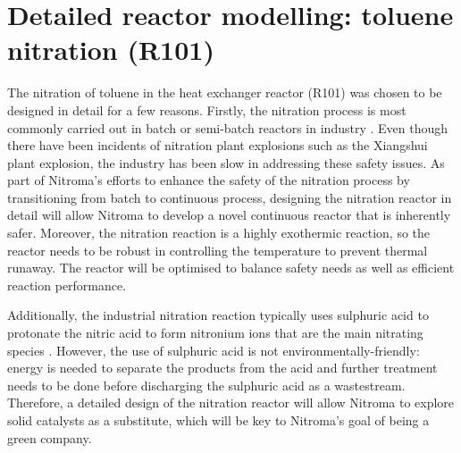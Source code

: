 \section{Detailed reactor modelling: toluene nitration (R101)} \label{sec:detailedreactor}

The nitration of toluene in the heat exchanger reactor (R101) was chosen to be designed in detail for a few reasons. Firstly, the nitration process is most commonly carried out in batch or semi-batch reactors in industry \cite{dugal_nitrobenzene_2005}. Even though there have been incidents of nitration plant explosions such as the Xiangshui plant explosion, the industry has been slow in addressing these safety issues. As part of Nitroma's efforts to enhance the safety of the nitration process by transitioning from batch to continuous process, designing the nitration reactor in detail will allow Nitroma to develop a novel continuous reactor that is inherently safer. Moreover, the nitration reaction is a highly exothermic reaction, so the reactor needs to be robust in controlling the temperature to prevent thermal runaway. The reactor will be optimised to balance safety needs as well as efficient reaction performance. 

Additionally, the industrial nitration reaction typically uses sulphuric acid to protonate the nitric acid to form nitronium ions that are the main nitrating species \cite{sreedhar_scientific_2013}. However, the use of sulphuric acid is not environmentally-friendly: energy is needed to separate the products from the acid and further treatment needs to be done before discharging the sulphuric acid as a wastestream. Therefore, a detailed design of the nitration reactor will allow Nitroma to explore solid catalysts as a substitute, which will be key to Nitroma's goal of being a green company.  


